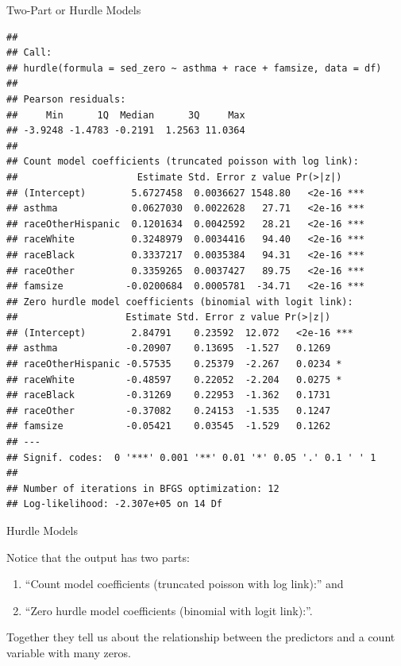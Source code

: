 \begin{frame}[fragile]{Two-Part or Hurdle Models}

\tiny

\begin{verbatim}
## 
## Call:
## hurdle(formula = sed_zero ~ asthma + race + famsize, data = df)
## 
## Pearson residuals:
##     Min      1Q  Median      3Q     Max 
## -3.9248 -1.4783 -0.2191  1.2563 11.0364 
## 
## Count model coefficients (truncated poisson with log link):
##                     Estimate Std. Error z value Pr(>|z|)    
## (Intercept)        5.6727458  0.0036627 1548.80   <2e-16 ***
## asthma             0.0627030  0.0022628   27.71   <2e-16 ***
## raceOtherHispanic  0.1201634  0.0042592   28.21   <2e-16 ***
## raceWhite          0.3248979  0.0034416   94.40   <2e-16 ***
## raceBlack          0.3337217  0.0035384   94.31   <2e-16 ***
## raceOther          0.3359265  0.0037427   89.75   <2e-16 ***
## famsize           -0.0200684  0.0005781  -34.71   <2e-16 ***
## Zero hurdle model coefficients (binomial with logit link):
##                   Estimate Std. Error z value Pr(>|z|)    
## (Intercept)        2.84791    0.23592  12.072   <2e-16 ***
## asthma            -0.20907    0.13695  -1.527   0.1269    
## raceOtherHispanic -0.57535    0.25379  -2.267   0.0234 *  
## raceWhite         -0.48597    0.22052  -2.204   0.0275 *  
## raceBlack         -0.31269    0.22953  -1.362   0.1731    
## raceOther         -0.37082    0.24153  -1.535   0.1247    
## famsize           -0.05421    0.03545  -1.529   0.1262    
## ---
## Signif. codes:  0 '***' 0.001 '**' 0.01 '*' 0.05 '.' 0.1 ' ' 1 
## 
## Number of iterations in BFGS optimization: 12 
## Log-likelihood: -2.307e+05 on 14 Df
\end{verbatim}

\Large

\end{frame}

\begin{frame}{Hurdle Models}

\large

Notice that the output has two parts:

\begin{enumerate}
\def\labelenumi{\arabic{enumi}.}
\tightlist
\item
  ``Count model coefficients (truncated poisson with log link):'' and
\item
  ``Zero hurdle model coefficients (binomial with logit link):''.
\end{enumerate}

Together they tell us about the relationship between the predictors and
a count variable with many zeros.

\end{frame}

